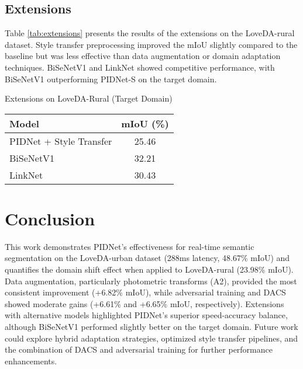\documentclass{article}
\begin{document}
\begin{multicols}{2}
		
		\subsection{Extensions}
		Table \ref{tab:extensions} presents the results of the extensions on the LoveDA-rural dataset. Style transfer preprocessing improved the mIoU slightly compared to the baseline but was less effective than data augmentation or domain adaptation techniques. BiSeNetV1 and LinkNet showed competitive performance, with BiSeNetV1 outperforming PIDNet-S on the target domain.
		

			\centering
			\caption{Extensions on LoveDA-Rural (Target Domain)}
			\label{tab:extensions}
			\begin{tabular}{|l|c|}
				\hline
				Model & mIoU (\%) \\ \hline
				PIDNet + Style Transfer & 25.46 \\ \hline
				BiSeNetV1 & 32.21 \\ \hline
				LinkNet & 30.43 \\ \hline
			\end{tabular}

		
		\section{Conclusion}
		This work demonstrates PIDNet's effectiveness for real-time semantic segmentation on the LoveDA-urban dataset (288ms latency, 48.67\% mIoU) and quantifies the domain shift effect when applied to LoveDA-rural (23.98\% mIoU). Data augmentation, particularly photometric transforms (A2), provided the most consistent improvement (+6.82\% mIoU), while adversarial training and DACS showed moderate gains (+6.61\% and +6.65\% mIoU, respectively). Extensions with alternative models highlighted PIDNet's superior speed-accuracy balance, although BiSeNetV1 performed slightly better on the target domain. Future work could explore hybrid adaptation strategies, optimized style transfer pipelines, and the combination of DACS and adversarial training for further performance enhancements.
		
	\end{multicols}
	
	
	
	
\end{document}
